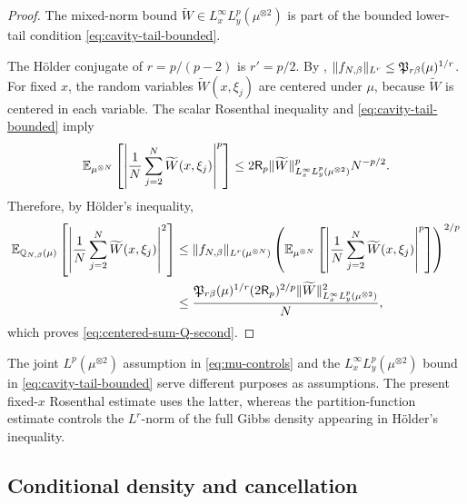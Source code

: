 \documentclass[11pt,reqno]{amsart}
\numberwithin{equation}{section}
\theoremstyle{plain}
\theoremstyle{remark}
\DeclarePairedDelimiter{\norm}{\lVert}{\rVert}
\newcommand{\E}{{\mathbb{E}}}
\newcommand{\Q}{{\mathbb{Q}}}
\newcommand{\tl}{\widetilde}
\newcommand{\be}{\beta}
\begin{document}
\begin{proof}
The mixed-norm bound \(\tl W\in L_x^\infty L_y^p(\mu^{\otimes2})\) is part of the bounded lower-tail condition \eqref{eq:cavity-tail-bounded}.

The H\"older conjugate of \(r=p/(p-2)\) is \(r'=p/2\).  By ,
\(\norm{f_{N,\be}}_{L^r}\le \mathfrak P_{r\be}(\mu)^{1/r}\).  For fixed \(x\), the random variables
\(\tl W(x,\xi_j)\) are centered under \(\mu\), because \(\tl W\) is centered in each variable.
The scalar Rosenthal inequality \cite{Rosenthal1970} and \eqref{eq:cavity-tail-bounded} imply
\begin{align}
 \E_{\mu^{\otimes N}}\left[\left|\frac1N\sum_{j=2}^N \tl W(x,\xi_j)\right|^p\right]
 \le 2\mathsf R_p
 \norm{\tl W}_{L_x^\infty L_y^p(\mu^{\otimes2})}^p
 N^{-p/2}.
\end{align}
Therefore, by H\"older's inequality,
\begin{align}
\E_{\Q_{N,\be}(\mu)}\left[\left|\frac1N\sum_{j=2}^N \tl W(x,\xi_j)\right|^2\right]
&\le \norm{f_{N,\be}}_{L^r(\mu^{\otimes N})}
\left(\E_{\mu^{\otimes N}}\left[\left|\frac1N\sum_{j=2}^N \tl W(x,\xi_j)\right|^p\right]\right)^{2/p}\notag\\
&\le
\frac{\mathfrak P_{r\be}(\mu)^{1/r}(2\mathsf R_p)^{2/p}
\norm{\tl W}_{L_x^\infty L_y^p(\mu^{\otimes2})}^2}{N},
\end{align}
which proves \eqref{eq:centered-sum-Q-second}.
\end{proof}

The joint \(L^p(\mu^{\otimes2})\) assumption in \eqref{eq:mu-controls} and the \(L_x^\infty L_y^p(\mu^{\otimes2})\) bound in \eqref{eq:cavity-tail-bounded} serve different purposes as assumptions.  The present fixed-\(x\) Rosenthal estimate uses the latter, whereas the partition-function estimate controls the \(L^r\)-norm of the full Gibbs density appearing in H\"older's inequality.

\subsection{Conditional density and cancellation}
\label{subsec:conditional-density-cancellation}
\end{document}
